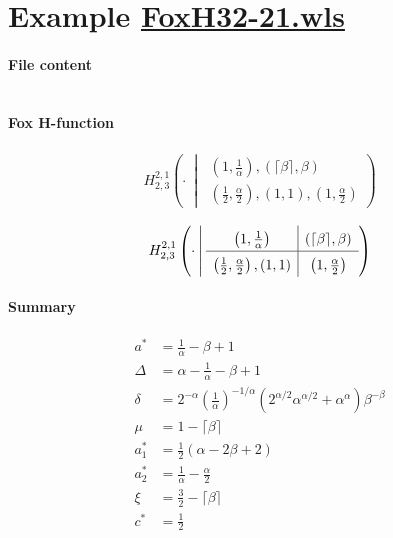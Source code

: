 \documentclass[11pt]{article}
\newcommand{\FoxH}[5]{H_{#2}^{#1}\left(#3\:\middle\vert\: \begin{array}{l}#4\\[0.4em] #5\end{array}\right)}
\begin{document}
\section{Example \url{FoxH32-21.wls}}

\paragraph{File content}

\inputminted{text}{FoxH32-21.wls}

\paragraph{Fox H-function}

\begin{align*}
  \FoxH
    {2,1}
    {2,3}
    {\cdot}
    {\left(1, \frac{1}{\alpha }\right), \left(\lceil \beta \rceil, \beta\right)}
    {\left(\frac{1}{2}, \frac{\alpha }{2}\right), \left(1, 1\right), \left(1, \frac{\alpha }{2}\right)}
\end{align*}

\begin{align*}
  \FoxHext
    {2,1}
    {2,3}
    {\cdot}
    {\left(1, \frac{1}{\alpha }\right)}
    {\left(\lceil \beta \rceil, \beta\right)}
    {\left(\frac{1}{2}, \frac{\alpha }{2}\right), \left(1, 1\right)}
    {\left(1, \frac{\alpha }{2}\right)}
\end{align*}

\paragraph{Summary}

\begin{align*}
  a^*    & = \frac{1}{\alpha }-\beta +1 \\
  \Delta & = \alpha -\frac{1}{\alpha }-\beta +1 \\
  \delta & = 2^{-\alpha } \left(\frac{1}{\alpha }\right)^{-1/\alpha } \left(2^{\alpha /2} \alpha ^{\alpha /2}+\alpha ^{\alpha }\right) \beta ^{-\beta } \\
  \mu    & = 1-\lceil \beta \rceil \\
  a_1^*  & = \frac{1}{2} (\alpha -2 \beta +2) \\
  a_2^*  & = \frac{1}{\alpha }-\frac{\alpha }{2} \\
  \xi    & = \frac{3}{2}-\lceil \beta \rceil \\
  c^*    & = \frac{1}{2} \\
\end{align*}
\end{document}
